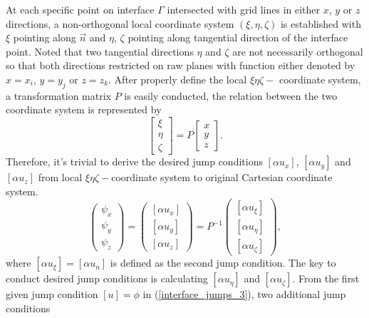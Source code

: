 \documentclass[dissertation]{uathesis}
\begin{document}
\begin{body}
At each specific point on interface $\Gamma$ intersected with grid lines in either $x$, $y$ or $z$ directions, a non-orthogonal local coordinate system $(\xi,\eta,\zeta)$ is established with $\xi$ pointing along $\vec{n}$ and $\eta$, $\zeta$ pointing along tangential direction of the interface point. Noted that two tangential directions $\eta$ and $\zeta$ are not necessarily orthogonal so that both directions restricted on raw planes with function either denoted by $x = x_i$, $y = y_j$ or $z = z_k$. After properly define the local $\xi\eta\zeta-$ coordinate system, a transformation matrix $P$ is easily conducted, the relation between the two coordinate system is represented by
%
\begin{equation}\label{orginal-to-local_3}
\begin{bmatrix}
\xi \\
\eta \\
\zeta 
\end{bmatrix}
=
P
\begin{bmatrix}
x \\
y \\
z
\end{bmatrix}.
\end{equation}
%
Therefore, it's trivial to derive the desired jump conditions $[\alpha u_{x}]$, $[\alpha u_{y}]$ and $[\alpha u_{z}]$ from local $\xi\eta\zeta-$coordinate system to original Cartesian coordinate system.
%
\begin{equation} \label{local-to-orginal_3}
\begin{pmatrix}
\psi_{x}    \\
\psi_{y}    \\
\psi_{z}
\end{pmatrix}
=
\begin{pmatrix}
[\alpha u_{x}]   \\
[\alpha u_{y}]   \\
[\alpha u_{z}]
\end{pmatrix}
=
P^{-1}
\begin{pmatrix}
[\alpha u_{\xi}]    \\
[\alpha u_{\eta}]   \\
[\alpha u_{\zeta}]
\end{pmatrix},
\end{equation}
%
where $[\alpha u_{\xi}] = [\alpha u_{n}]$ is defined as the second jump condition. The key to conduct desired jump conditions is calculating $[\alpha u_{\eta}]$ and $[\alpha u_{\zeta}]$. From the first given jump condition $[u]=\phi$ in (\ref{interface_jumps_3}), two additional jump conditions 

\end{body}
\end{document}
